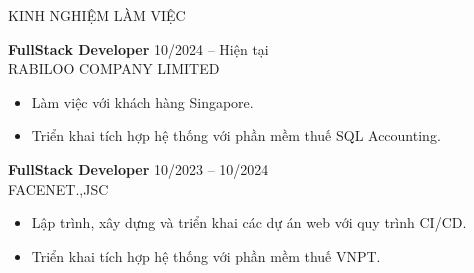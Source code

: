 \documentclass{resume}
\begin{document}
\begin{rSection}{KINH NGHIỆM LÀM VIỆC}

\textbf{FullStack Developer} \hfill 10/2024 -- Hiện tại\\
RABILOO COMPANY LIMITED
\begin{itemize}
    \itemsep -3pt {}
    \item Làm việc với khách hàng Singapore.
    \item Triển khai tích hợp hệ thống với phần mềm thuế SQL Accounting.
\end{itemize}
 
\textbf{FullStack Developer} \hfill 10/2023 -- 10/2024\\
FACENET.,JSC
\begin{itemize}
    \itemsep -3pt {}
    \item Lập trình, xây dựng và triển khai các dự án web với quy trình CI/CD.
    \item Triển khai tích hợp hệ thống với phần mềm thuế VNPT.
\end{itemize}

\end{rSection}
\end{document}

